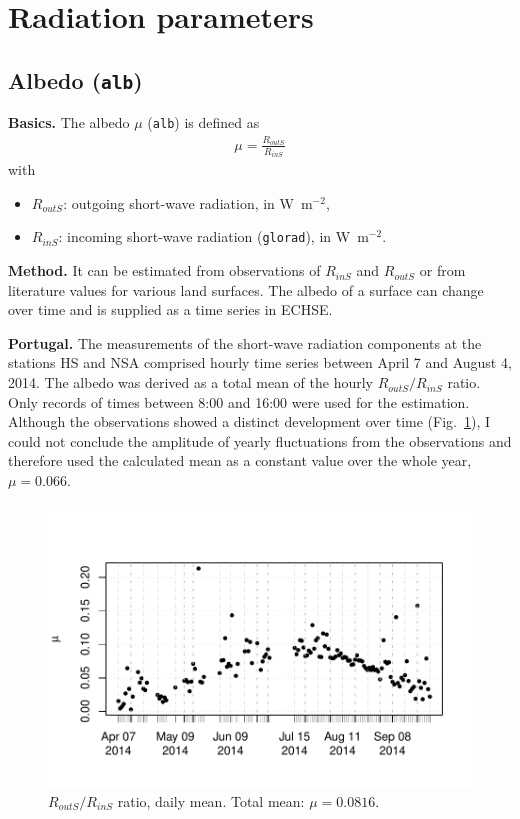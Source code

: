 \documentclass{scrreprt}
\newenvironment{denseitem}{
  \begin{itemize}
    \setlength{\itemsep}{0pt}
    \setlength{\parskip}{0pt}
    \setlength{\parsep}{0pt}
}{
  \end{itemize}
}
\begin{document}
\newpage
\section{Radiation parameters} \label{sec:parest_rad}

\subsection{Albedo (\texttt{alb})} \label{ssec:parest_rad_alb}

\textbf{Basics.}
The albedo $\mu$ (\verb!alb!) is defined as
\begin{align*}
  \mu = \frac{R_{outS}}{R_{inS}}
\end{align*}
%
with
\begin{denseitem}
  \item[] $R_{outS}$: outgoing short-wave radiation, in W~m$^{-2}$,
  \item[] $R_{inS}$: incoming short-wave radiation (\verb!glorad!), in W~m$^{-2}$.
\end{denseitem}

\noindent
\textbf{Method.}
It can be estimated from observations of $R_{inS}$ and $R_{outS}$ or from literature values for various land surfaces.
The albedo of a surface can change over time and is supplied as a time series in ECHSE.

\noindent
\textbf{Portugal.}
The measurements of the short-wave radiation components at the stations HS and NSA comprised hourly time series between April 7 and August 4, 2014.
The albedo was derived as a total mean of the hourly $R_{outS}/R_{inS}$ ratio.
Only records of times between 8:00 and 16:00 were used for the estimation.
Although the observations showed a distinct development over time (Fig.~\ref{fig:portugal_alb}), I could not conclude the amplitude of yearly fluctuations from the observations and therefore used the calculated mean as a constant value over the whole year, $\mu = 0.066$.

\begin{figure}[ht]
  \centering
  \includegraphics[width=0.6\hsize]{./plot_alb.pdf}
  \caption{$R_{outS}/R_{inS}$ ratio, daily mean. Total mean: $\mu = 0.0816$.}
  \label{fig:portugal_alb}
\end{figure}
\end{document}
